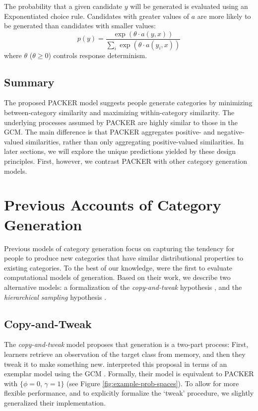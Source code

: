 \documentclass[10pt,letterpaper]{article}
\begin{document}
The probability that a given candidate $y$ will be generated is evaluated using an Exponentiated \citet{luce1977choice} choice rule. Candidates with greater values of $a$ are more likely to be generated than candidates with smaller values:
\begin{equation}
p(y) = \dfrac
    { \exp( { \theta \cdot a(y, x) } ) }
    { \sum_i{ \exp( { \theta \cdot a(y_i, x) } ) } }
    \label{eq:packer-choice}
\end{equation}
where $\theta$ ($\theta \geq 0$) controls response determinism. 

\subsection{Summary}
The proposed PACKER model suggests people generate categories by minimizing between-category similarity and maximizing within-category similarity. The underlying processes assumed by PACKER are highly similar to those in the GCM. The main difference is that PACKER aggregates positive- and negative-valued similarities, rather than only aggregating positive-valued similarities. In later sections, we will explore the unique predictions yielded by these design principles. First, however, we contrast PACKER with other category generation models. 

\section{Previous Accounts of Category Generation}

Previous models of category generation focus on capturing the tendency for people to produce new categories that have similar distributional properties to existing categories. To the best of our knowledge, \citet{jern2013probabilistic} were the first to evaluate computational models of generation. Based on their work, we describe two alternative models: a formalization of the \textit{copy-and-tweak} hypothesis \citep{ward1995s}, and the \textit{hierarchical sampling} hypothesis \citep{jern2013probabilistic}.


\subsection{Copy-and-Tweak}
The \textit{copy-and-tweak} model proposes that generation is a two-part process: First, learners retrieve an observation of the target class from memory, and then they tweak it to make something new. \citet{jern2013probabilistic} interpreted this proposal in terms of an exemplar model using the GCM \citep{nosofsky1984choice}. Formally, their model is equivalent to PACKER with $\{\phi = 0$, $\gamma = 1\}$ (see Figure \ref{fig:example-prob-spaces}). To allow for more flexible performance, and to explicitly formalize the `tweak' procedure, we slightly generalized their implementation.
\end{document}
